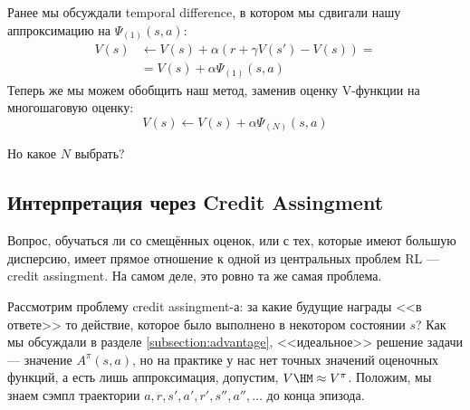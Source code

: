 Ранее мы обсуждали temporal difference, в котором мы сдвигали нашу аппроксимацию на $\Psi_{(1)}(s, a)$:
\begin{align*}
V(s) &\leftarrow V(s) + \alpha \left( r + \gamma V(s') - V(s) \right) = \\ &= V(s) + \alpha \Psi_{(1)}(s, a)
\end{align*}
Теперь же мы можем обобщить наш метод, заменив оценку V-функции на многошаговую оценку:
$$V(s) \leftarrow V(s) + \alpha \Psi_{(N)}(s, a)$$

Но какое $N$ выбрать?

\subsection{Интерпретация через Credit Assingment}

Вопрос, обучаться ли со смещённых оценок, или с тех, которые имеют большую дисперсию, имеет прямое отношение к одной из центральных проблем RL --- credit assingment. На самом деле, это ровно та же самая проблема. 

Рассмотрим проблему credit assingment-а: за какие будущие награды <<в ответе>> то действие, которое было выполнено в некотором состоянии $s$? Как мы обсуждали в разделе \ref{subsection:advantage}, <<идеальное>> решение задачи --- значение $A^\pi(s, a)$, но на практике у нас нет точных значений оценочных функций, а есть лишь аппроксимация, допустим, $V \HM \approx V^\pi$. Положим, мы знаем сэмпл траектории $a, r, s', a', r', s'', a'', \dots$ до конца эпизода. 



